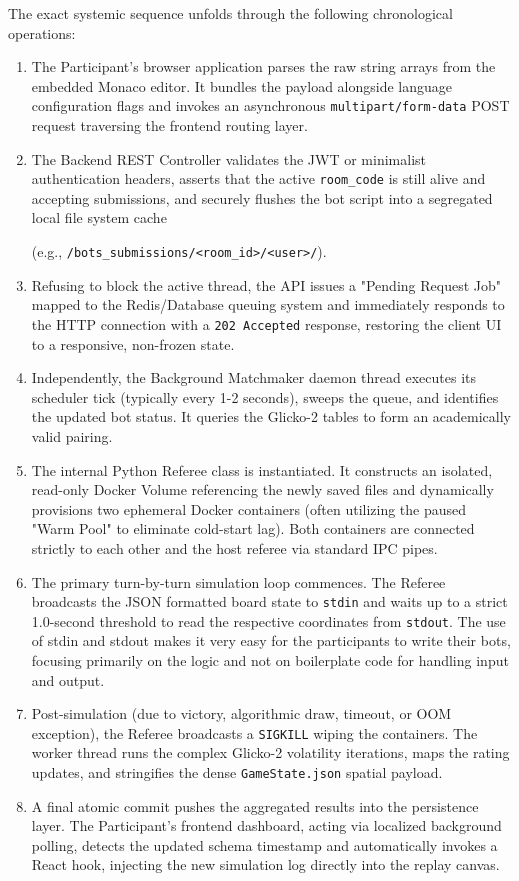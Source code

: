 \documentclass[12pt,a4paper]{report}
\begin{document}
The exact systemic sequence unfolds through the following chronological operations:
\begin{enumerate}
    \item The Participant's browser application parses the raw string arrays from the embedded Monaco editor. It bundles the payload alongside language configuration flags and invokes an asynchronous \texttt{multipart/form-data} POST request traversing the frontend routing layer.
    \item The Backend REST Controller validates the JWT or minimalist authentication headers, asserts that the active \texttt{room\_code} is still alive and accepting submissions, and securely flushes the bot script into a segregated local file system cache 


    (e.g., \texttt{/bots\_submissions/<room\_id>/<user>/}).
    \item Refusing to block the active thread, the API issues a "Pending Request Job" mapped to the Redis/Database queuing system and immediately responds to the HTTP connection with a \texttt{202 Accepted} response, restoring the client UI to a responsive, non-frozen state.
    \item Independently, the Background Matchmaker daemon thread executes its scheduler tick (typically every 1-2 seconds), sweeps the queue, and identifies the updated bot status. It queries the Glicko-2 tables to form an academically valid pairing.
    \item The internal Python Referee class is instantiated. It constructs an isolated, read-only Docker Volume referencing the newly saved files and dynamically provisions two ephemeral Docker containers (often utilizing the paused "Warm Pool" to eliminate cold-start lag). Both containers are connected strictly to each other and the host referee via standard IPC pipes.
    \item The primary turn-by-turn simulation loop commences. The Referee broadcasts the JSON formatted board state to \texttt{stdin} and waits up to a strict 1.0-second threshold to read the respective coordinates from \texttt{stdout}. The use of stdin and stdout makes it very easy for the participants to write their bots, focusing primarily on the logic and not on boilerplate code for handling input and output.
    \item Post-simulation (due to victory, algorithmic draw, timeout, or OOM exception), the Referee broadcasts a \texttt{SIGKILL} wiping the containers. The worker thread runs the complex Glicko-2 volatility iterations, maps the rating updates, and stringifies the dense \texttt{GameState.json} spatial payload.
    \item A final atomic commit pushes the aggregated results into the persistence layer. The Participant's frontend dashboard, acting via localized background polling, detects the updated schema timestamp and automatically invokes a React hook, injecting the new simulation log directly into the replay canvas.
\end{enumerate}
\end{document}
